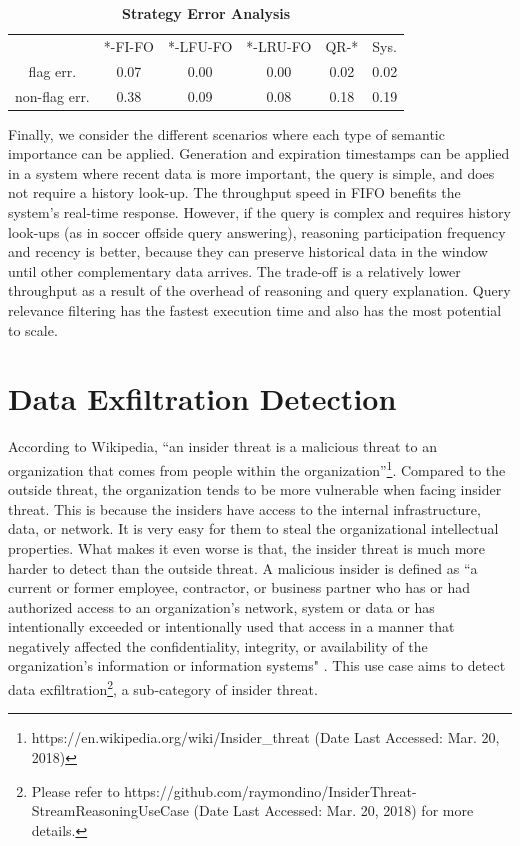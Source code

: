 \begin{table}[!htbp]
\centering
\caption{\textbf{Strategy Error Analysis}}
\label{tab:error}
\begin{tabular}{|c||c|c|c|c|l|}
\hline
 & *-FI-FO & *-LFU-FO & *-LRU-FO & QR-* & Sys. \\ \hhline{|=#=|=|=|=|=|}
flag err. & 0.07 & 0.00 & 0.00 & 0.02 & 0.02 \\ \hline
non-flag err. & 0.38 & 0.09 & 0.08 & 0.18 & 0.19 \\ \hline
\end{tabular}
\end{table}

Finally, we consider the different scenarios where each type of semantic importance can be applied. 
Generation and expiration timestamps can be applied in a system where recent data is more important, the query is simple, and does not require a history look-up. 
The throughput speed in FIFO benefits the system's real-time response. 
However, if the query is complex and requires history look-ups (as in soccer offside query answering), reasoning participation frequency and recency is better, because they can preserve historical data in the window until other complementary data arrives. 
The trade-off is a relatively lower throughput as a result of the overhead of reasoning and query explanation.
Query relevance filtering has the fastest execution time and also has the most potential to scale.
%
\section{Data Exfiltration Detection}
According to Wikipedia, ``an insider threat is a malicious threat to an organization that comes from people within the organization''\footnote{https://en.wikipedia.org/wiki/Insider\_threat (Date Last Accessed: Mar. 20, 2018)}. 
Compared to the outside threat, the organization tends to be more vulnerable when facing insider threat. 
This is because the insiders have access to the internal infrastructure, data, or network.
It is very easy for them to steal the organizational intellectual properties.
What makes it even worse is that, the insider threat is much more harder to detect than the outside threat. 
A malicious insider is defined as ``a current or former employee, contractor, or business partner who has or had authorized access to an organization's network, system or data or has intentionally exceeded or intentionally used that access in a manner that negatively affected the confidentiality, integrity, or availability of the organization's information or information systems" \cite{CERT-onto} \cite{silowash2012common}.
This use case aims to detect data exfiltration\footnote{Please refer to https://github.com/raymondino/InsiderThreat-StreamReasoningUseCase (Date Last Accessed: Mar. 20, 2018) for more details.}, a sub-category of insider threat.
%
